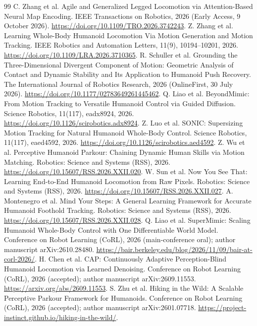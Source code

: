 \documentclass[11pt,a4paper]{article}
\begin{document}
\begin{thebibliography}{99}
 C. Zhang et al. Agile and Generalized Legged Locomotion via Attention-Based Neural Map Encoding. IEEE Transactions on Robotics, 2026 (Early Access, 9 October 2026). \url{https://doi.org/10.1109/TRO.2026.3742243}.
 Z. Zhang et al. Learning Whole-Body Humanoid Locomotion Via Motion Generation and Motion Tracking. IEEE Robotics and Automation Letters, 11(9), 10194--10201, 2026. \url{https://doi.org/10.1109/LRA.2026.3710365}.
 R. Schuller et al. Grounding the Three-Dimensional Divergent Component of Motion: Geometric Analysis of Contact and Dynamic Stability and Its Application to Humanoid Push Recovery. The International Journal of Robotics Research, 2026 (OnlineFirst, 30 July 2026). \url{https://doi.org/10.1177/02783649261445462}.
 Q. Liao et al. BeyondMimic: From Motion Tracking to Versatile Humanoid Control via Guided Diffusion. Science Robotics, 11(117), eadx8924, 2026. \url{https://doi.org/10.1126/scirobotics.adx8924}.
 Z. Luo et al. SONIC: Supersizing Motion Tracking for Natural Humanoid Whole-Body Control. Science Robotics, 11(117), eaed4592, 2026. \url{https://doi.org/10.1126/scirobotics.aed4592}.
 Z. Wu et al. Perceptive Humanoid Parkour: Chaining Dynamic Human Skills via Motion Matching. Robotics: Science and Systems (RSS), 2026. \url{https://doi.org/10.15607/RSS.2026.XXII.020}.
 W. Sun et al. Now You See That: Learning End-to-End Humanoid Locomotion from Raw Pixels. Robotics: Science and Systems (RSS), 2026. \url{https://doi.org/10.15607/RSS.2026.XXII.027}.
 A. Montenegro et al. Mind Your Steps: A General Learning Framework for Accurate Humanoid Foothold Tracking. Robotics: Science and Systems (RSS), 2026. \url{https://doi.org/10.15607/RSS.2026.XXII.028}.
 Q. Liao et al. SuperMimic: Scaling Humanoid Whole-Body Control with One Differentiable World Model. Conference on Robot Learning (CoRL), 2026 (main-conference oral); author manuscript arXiv:2610.28480. \url{https://bair.berkeley.edu/blog/2026/11/09/bair-at-corl-2026/}.
 H. Chen et al. CAP: Continuously Adaptive Perception-Blind Humanoid Locomotion via Learned Denoising. Conference on Robot Learning (CoRL), 2026 (accepted); author manuscript arXiv:2609.11553. \url{https://arxiv.org/abs/2609.11553}.
 S. Zhu et al. Hiking in the Wild: A Scalable Perceptive Parkour Framework for Humanoids. Conference on Robot Learning (CoRL), 2026 (accepted); author manuscript arXiv:2601.07718. \url{https://project-instinct.github.io/hiking-in-the-wild/}.

\end{thebibliography}
\end{document}
